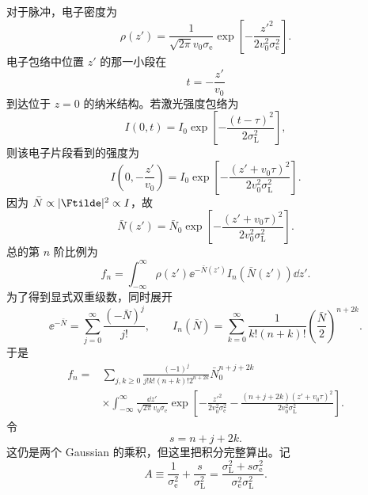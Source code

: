对于脉冲，电子密度为
\begin{equation}
\rho(z')=\frac{1}{\sqrt{2\pi}v_0\sigma_{\mathrm e}}
\exp\!\left[-\frac{z'^2}{2v_0^2\sigma_{\mathrm e}^2}\right].
\end{equation}
电子包络中位置 \(z'\) 的那一小段在
\begin{equation}
t=-\frac{z'}{v_0}
\end{equation}
到达位于 \(z=0\) 的纳米结构。若激光强度包络为
\begin{equation}
I(0,t)=I_0\exp\!\left[-\frac{(t-\tau)^2}{2\sigma_{\mathrm L}^2}\right],
\end{equation}
则该电子片段看到的强度为
\begin{equation}
I\!\left(0,-\frac{z'}{v_0}\right)
=I_0\exp\!\left[-\frac{(z'+v_0\tau)^2}{2v_0^2\sigma_{\mathrm L}^2}\right].
\end{equation}
因为 \(\bar N\propto|\Ftilde|^2\propto I\)，故
\begin{equation}
\boxed{
\bar N(z')=\bar N_0
\exp\!\left[-\frac{(z'+v_0\tau)^2}{2v_0^2\sigma_{\mathrm L}^2}\right].}
\label{eq:Nbar-z}
\end{equation}
总的第 \(n\) 阶比例为
\begin{equation}
f_n=\int_{-\infty}^{\infty}\rho(z')
\ee^{-\bar N(z')}I_n(\bar N(z'))\dd z'.
\label{eq:fn_incoherent}
\end{equation}
为了得到显式双重级数，同时展开
\begin{equation}
\ee^{-\bar N}=\sum_{j=0}^{\infty}\frac{(-\bar N)^j}{j!},
\qquad
I_n(\bar N)=\sum_{k=0}^{\infty}
\frac{1}{k!(n+k)!}\left(\frac{\bar N}{2}\right)^{n+2k}.
\end{equation}
于是
\begin{align}
f_n
={}&\sum_{j,k\ge0}
\frac{(-1)^j}{j!k!(n+k)!2^{n+2k}}
\bar N_0^{n+j+2k}\\
&\times\int_{-\infty}^{\infty}
\frac{\dd z'}{\sqrt{2\pi}v_0\sigma_{\mathrm e}}
\exp\!\left[-\frac{z'^2}{2v_0^2\sigma_{\mathrm e}^2}
-\frac{(n+j+2k)(z'+v_0\tau)^2}
{2v_0^2\sigma_{\mathrm L}^2}\right].
\label{eq:incoherent-series-coefficients}
\end{align}
令
\begin{equation}
s=n+j+2k.
\end{equation}
这仍是两个 Gaussian 的乘积，但这里把积分完整算出。记
\begin{equation}
A\equiv\frac{1}{\sigma_{\mathrm e}^2}+\frac{s}{\sigma_{\mathrm L}^2}
=\frac{\sigma_{\mathrm L}^2+s\sigma_{\mathrm e}^2}
{\sigma_{\mathrm e}^2\sigma_{\mathrm L}^2}.
\end{equation}
